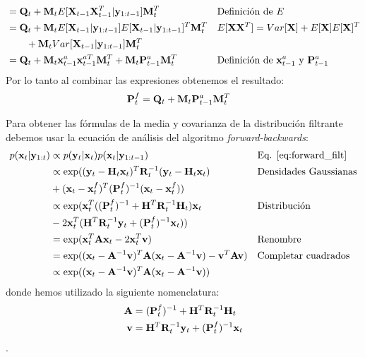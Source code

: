 \begin{align*}
    &= \mathbf{Q}_t + \mathbf{M}_t E[\mathbf{X}_{t-1} \mathbf{X}_{t-1}^T | \mathbf{y}_{1:t-1}] \mathbf{M}_t^T && \text{Definición de $E$}\\
    &= \mathbf{Q}_t + \mathbf{M}_t E[\mathbf{X}_{t-1} | \mathbf{y}_{1:t-1}]E[\mathbf{X}_{t-1} | \mathbf{y}_{1:t-1}]^T \mathbf{M}_t^T && \text{$E[\mathbf{X} \mathbf{X}^T] = Var[\mathbf{X}] + E[\mathbf{X}]E[\mathbf{X}]^T$} \\
    &\hspace{2em} + \mathbf{M}_t Var[\mathbf{X}_{t-1} | \mathbf{y}_{1:t-1}] \mathbf{M}_t^T \\
    &= \mathbf{Q}_t + \mathbf{M}_t \mathbf{x}_{t-1}^a \mathbf{x}_{t-1}^{aT} \mathbf{M}_t^T + \mathbf{M}_t \mathbf{P}_{t-1}^a \mathbf{M}_t^T && \text{Definición de $\mathbf{x}_{t-1}^a$ y $\mathbf{P}_{t-1}^a$}\\
\end{align*}
Por lo tanto al combinar las expresiones obtenemos el resultado:
\begin{align*}
    \mathbf{P}_t^f &= \mathbf{Q}_t + \mathbf{M}_t \mathbf{P}_{t-1}^a \mathbf{M}_t^T
\end{align*}

Para obtener las fórmulas de la media y covarianza de la distribución filtrante debemos usar la ecuación de análisis del algoritmo \textit{forward-backwards}:
\begin{align*}
    p(\mathbf{x}_t | \mathbf{y}_{1:t}) &\propto p(\mathbf{y}_t | \mathbf{x}_t) p(\mathbf{x}_t | \mathbf{y}_{1:t-1}) && \text{Eq. \ref{eq:forward_filt}} \\
    &\propto \exp((\mathbf{y}_t - \mathbf{H}_t \mathbf{x}_t)^T \mathbf{R}_t^{-1} (\mathbf{y}_t - \mathbf{H}_t \mathbf{x}_t) && \text{Densidades Gaussianas}\\ 
    &+ (\mathbf{x}_t - \mathbf{x}_t^f)^T \mathbf{(}\mathbf{P}_t^{f})^{-1} (\mathbf{x}_t - \mathbf{x}_t^f)) \\
    &\propto \exp(\mathbf{x}_t^T (\mathbf{(}\mathbf{P}_t^f)^{-1} + \mathbf{H}^T \mathbf{R}_t^{-1} \mathbf{H}_t) \mathbf{x}_t && \text{Distribución}\\
    &- 2 \mathbf{x}_t^T (\mathbf{H}^T \mathbf{R}_t^{-1} \mathbf{y}_t + (\mathbf{P}_t^{f})^{-1} \mathbf{x}_t)) \\
    &= \exp(\mathbf{x}_t^T \mathbf{A} \mathbf{x}_t - 2\mathbf{x}_t^T \mathbf{v}) && \text{Renombre}\\
    &= \exp((\mathbf{x}_t - \mathbf{A}^{-1}\mathbf{v})^T \mathbf{A} (\mathbf{x}_t - \mathbf{A}^{-1}\mathbf{v}) - \mathbf{v}^T \mathbf{A} \mathbf{v}) && \text{Completar cuadrados}\\
    &\propto \exp((\mathbf{x}_t - \mathbf{A}^{-1}\mathbf{v})^T \mathbf{A} (\mathbf{x}_t - \mathbf{A}^{-1}\mathbf{v}))
\end{align*}
donde hemos utilizado la siguiente nomenclatura:
\begin{align*}
    \mathbf{A} &= \mathbf{(}\mathbf{P}_t^f)^{-1} + \mathbf{H}^T \mathbf{R}_t^{-1} \mathbf{H}_t \\
    \mathbf{v} &= \mathbf{H}^T \mathbf{R}_t^{-1} \mathbf{y}_t + (\mathbf{P}_t^{f})^{-1} \mathbf{x}_t
\end{align*}.

